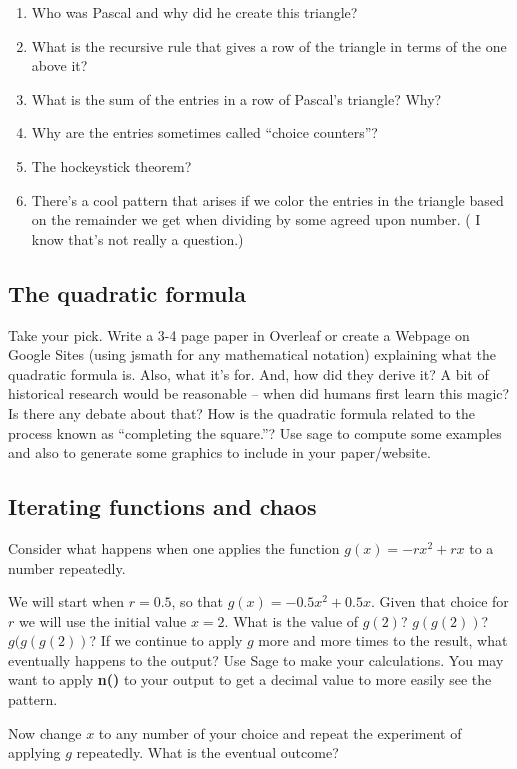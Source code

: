 \begin{enumerate}
	\item Who was Pascal and why did he create this triangle?
	\item What is the recursive rule that gives a row of the triangle in terms of the one above it?
	\item What is the sum of the entries in a row of Pascal's triangle?  Why?
	\item Why are the entries sometimes called ``choice counters''?
	\item The hockeystick theorem?
	\item There's a cool pattern that arises if we color the entries in the triangle based on the remainder we get when dividing by some agreed upon number. ( I know that's not really a question.)
\end{enumerate}

\subsection{The quadratic formula}

Take your pick.  Write a 3-4 page paper in Overleaf or create a Webpage on Google Sites (using jsmath for any mathematical notation) explaining what the quadratic formula is. Also, what it's for. And, how did they derive it?
A bit of historical research would be reasonable -- when did humans first learn this magic?  Is there any debate about that?  How is the quadratic formula related to the process known as ``completing the square.''?  Use sage to compute some examples and also to generate some graphics to include in your paper/website.


\subsection{Iterating functions and chaos}

Consider what happens when one applies the function $g(x)=-rx^2+rx$
to a number repeatedly.

We will start when $r=0.5$, so that $g(x)=-0.5x^2+0.5x$. Given that choice for $r$ we will use the initial value $x=2$. What is the value of $g(2)$? $g(g(2))$? $g(g(g(2))$?
If we continue to apply $g$ more and more times to the result, what eventually
happens to the output? Use Sage to make your calculations. You may want to
apply \textbf{n()} to your output to get a decimal value to more easily
see the pattern.

Now change $x$ to any number of your choice and repeat the experiment of
applying $g$ repeatedly. What is the eventual outcome?

